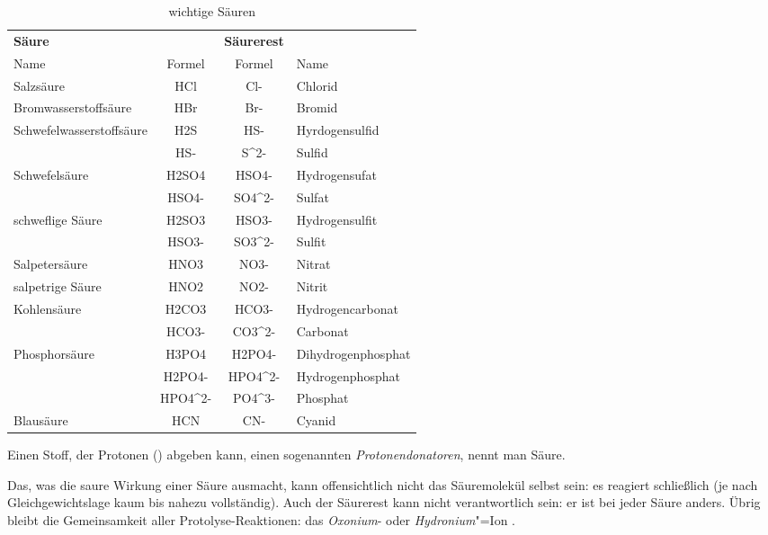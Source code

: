 \documentclass{scrartcl}
\begin{document}
\begin{table}
  \centering
  \caption{wichtige Säuren}\label{tab:saeuren}
  \begin{tabular}{lCCl}
    \toprule
      \bfseries Säure          &         & \textbf{Säurerest} \\
      Name                     & Formel  & Formel  & Name \\
    \midrule
      Salzsäure                & HCl     & Cl-     & Chlorid \\
      Bromwasserstoffsäure     & HBr     & Br-     & Bromid \\
      Schwefelwasserstoffsäure & H2S     & HS-     & Hyrdogensulfid \\
                               & HS-     & S^2-    & Sulfid \\
      Schwefelsäure            & H2SO4   & HSO4-   & Hydrogensufat \\
                               & HSO4-   & SO4^2-  & Sulfat \\
      schweflige Säure         & H2SO3   & HSO3-   & Hydrogensulfit \\
                               & HSO3-   & SO3^2-  & Sulfit \\
      Salpetersäure            & HNO3    & NO3-    & Nitrat \\
      salpetrige Säure         & HNO2    & NO2-    & Nitrit \\
      Kohlensäure              & H2CO3   & HCO3-   & Hydrogencarbonat \\
                               & HCO3-   & CO3^2-  & Carbonat \\
      Phosphorsäure            & H3PO4   & H2PO4-  & Dihydrogenphosphat \\
                               & H2PO4-  & HPO4^2- & Hydrogenphosphat \\
                               & HPO4^2- & PO4^3-  & Phosphat \\
      Blausäure                & HCN     & CN-     & Cyanid \\
    \bottomrule
  \end{tabular}
\end{table}

\begin{definition}
  Einen Stoff, der Protonen (\Hpl) abgeben kann, einen sogenannten
  \emph{Protonendonatoren}, nennt man Säure.
\end{definition}

Das, was die saure Wirkung einer Säure ausmacht, kann offensichtlich nicht das
Säuremolekül selbst sein: es reagiert schließlich (je nach Gleichgewichtslage
kaum bis nahezu vollständig).  Auch der Säurerest kann nicht verantwortlich
sein: er ist bei jeder Säure anders.  Übrig bleibt die Gemeinsamkeit aller
Protolyse-Reaktionen: das \emph{Oxonium}- oder
\emph{Hydronium}"=Ion .
\end{document}
